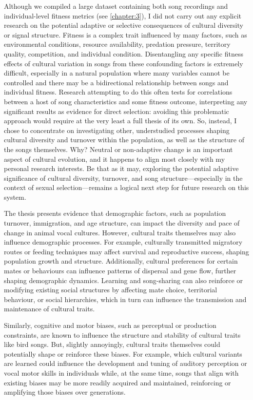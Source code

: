Although we compiled a large dataset containing both song recordings and individual-level fitness metrics (see \autoref{chapter:3}), I did not carry out any explicit research on the potential adaptive or selective consequences of cultural diversity or signal structure. Fitness is a complex trait influenced by many factors, such as environmental conditions, resource availability, predation pressure, territory quality, competition, and individual condition. Disentangling any specific fitness effects of cultural variation in songs from these confounding factors is extremely difficult, especially in a natural population where many variables cannot be controlled and there may be a bidirectional relationship between songs and individual fitness. Research attempting to do this often tests for correlations between a host of song characteristics and some fitness outcome, interpreting any significant results as evidence for direct selection: avoiding this problematic approach would require at the very least a full thesis of its own. So, instead, I chose to concentrate on investigating other, understudied processes shaping cultural diversity and turnover within the population, as well as the structure of the songs themselves. Why? Neutral or non-adaptive change is an important aspect of cultural evolution, and it happens to align most closely with my personal research interests. Be that as it may, exploring the potential adaptive significance of cultural diversity, turnover, and song structure---especially in the context of sexual selection---remains a logical next step for future research on this system.

The thesis presents evidence that demographic factors, such as population turnover, immigration, and age structure, can impact the diversity and pace of change in animal vocal cultures. However, cultural traits themselves may also influence demographic processes. For example, culturally transmitted migratory routes or feeding techniques may affect survival and reproductive success, shaping population growth and structure. Additionally, cultural preferences for certain mates or behaviours can influence patterns of dispersal and gene flow, further shaping demographic dynamics. Learning and song-sharing can also  reinforce or modifying existing social structures by affecting mate choice, territorial behaviour, or social hierarchies, which in turn can influence the transmission and maintenance of cultural traits. 

Similarly, cognitive and motor biases, such as perceptual or production constraints, are known to influence the structure and stability of cultural traits like bird songs. But, slightly annoyingly, cultural traits themselves could potentially shape or reinforce these biases. For example, which cultural variants are learned could influence the development and tuning of auditory perception or vocal motor skills in individuals while, at the same time, songs that align with existing biases may be more readily acquired and maintained, reinforcing or amplifying those biases over generations.

